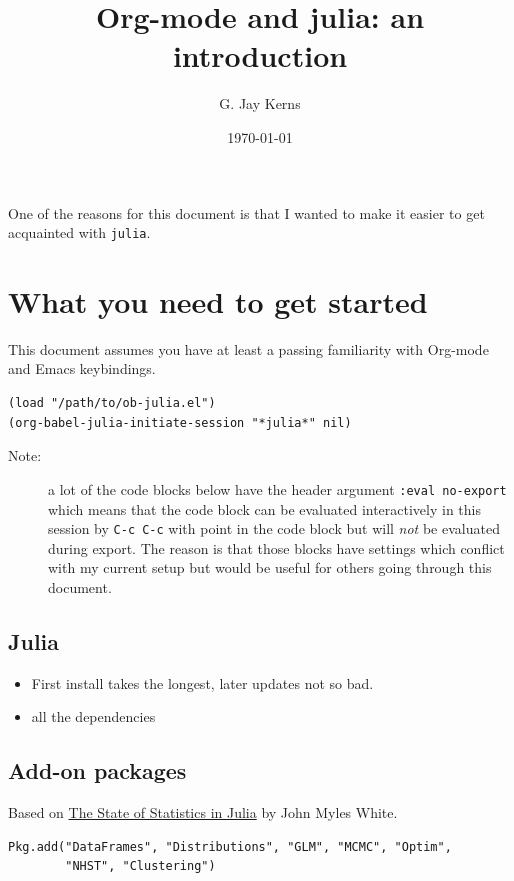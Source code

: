 \documentclass[11pt]{article}
\author{G. Jay Kerns}
\date{\today}
\title{Org-mode and julia: an introduction}
\begin{document}
\maketitle
\tableofcontents

One of the reasons for this document is that I wanted to make it easier to get acquainted with \texttt{julia}.  

\section[What you need to get started]{What you need to get started}
\label{sec-1}

This document assumes you have at least a passing familiarity with Org-mode and Emacs keybindings.  

\begin{verbatim}
(load "/path/to/ob-julia.el")
(org-babel-julia-initiate-session "*julia*" nil)
\end{verbatim}

\begin{description}
\item[Note:] a lot of the code blocks below have the header argument \texttt{:eval no-export} which means that the code block can be evaluated interactively in this session by \texttt{C-c C-c} with point in the code block but will \emph{not} be evaluated during export.  The reason is that those blocks have settings which conflict with my current setup but would be useful for others going through this document.
\end{description}

\subsection[Julia]{Julia}
\label{sec-1-1}
\begin{itemize}
\item First install takes the longest, later updates not so bad.
\item all the dependencies
\end{itemize}
\subsection[Add-on packages]{Add-on packages}
\label{sec-1-2}

Based on \href{http://www.johnmyleswhite.com/notebook/2012/12/02/the-state-of-statistics-in-julia/}{The State of Statistics in Julia} by John Myles White.

\begin{verbatim}
Pkg.add("DataFrames", "Distributions", "GLM", "MCMC", "Optim", 
        "NHST", "Clustering")
\end{verbatim}
\end{document}
